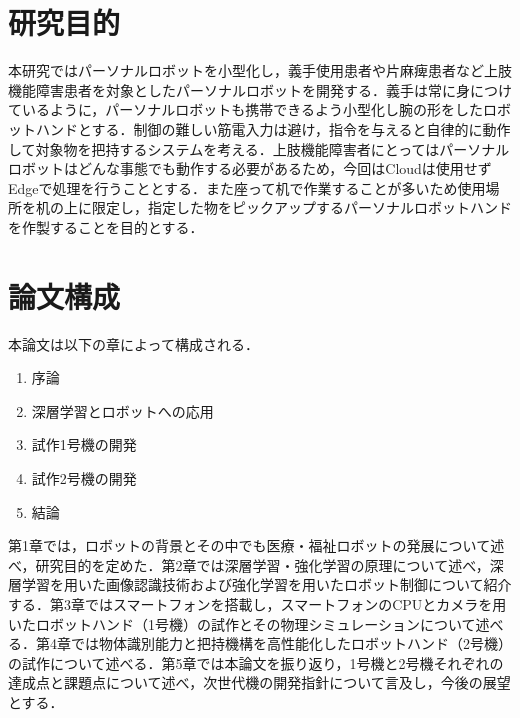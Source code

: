 \section{研究目的}

本研究ではパーソナルロボットを小型化し，義手使用患者や片麻痺患者など上肢機能障害患者を対象としたパーソナルロボットを開発する．義手は常に身につけているように，パーソナルロボットも携帯できるよう小型化し腕の形をしたロボットハンドとする．制御の難しい筋電入力は避け，指令を与えると自律的に動作して対象物を把持するシステムを考える．上肢機能障害者にとってはパーソナルロボットはどんな事態でも動作する必要があるため，今回はCloudは使用せずEdgeで処理を行うこととする．また座って机で作業することが多いため使用場所を机の上に限定し，指定した物をピックアップするパーソナルロボットハンドを作製することを目的とする．

\section{論文構成}
本論文は以下の章によって構成される．
\begin{enumerate}
    \item 序論
    \item 深層学習とロボットへの応用
    \item 試作1号機の開発
    \item 試作2号機の開発
    \item 結論
\end{enumerate}
第1章では，ロボットの背景とその中でも医療・福祉ロボットの発展について述べ，研究目的を定めた．第2章では深層学習・強化学習の原理について述べ，深層学習を用いた画像認識技術および強化学習を用いたロボット制御について紹介する．第3章ではスマートフォンを搭載し，スマートフォンのCPUとカメラを用いたロボットハンド（1号機）の試作とその物理シミュレーションについて述べる．第4章では物体識別能力と把持機構を高性能化したロボットハンド（2号機）の試作について述べる．第5章では本論文を振り返り，1号機と2号機それぞれの達成点と課題点について述べ，次世代機の開発指針について言及し，今後の展望とする．

